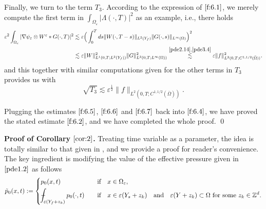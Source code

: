 \documentclass[13pt,CJK]{article}
\theoremstyle{plain}                       %
\theoremstyle{remark}
\numberwithin{equation}{section}
\def\Xint#1{\mathchoice
  {\XXint\displaystyle\textstyle{#1}}%
  {\XXint\textstyle\scriptstyle{#1}}%
  {\XXint\scriptstyle\scriptscriptstyle{#1}}%
  {\XXint\scriptscriptstyle\scriptscriptstyle{#1}}%
  \!\int}
\def\XXint#1#2#3{{\setbox0=\hbox{$#1{#2#3}{\int}$}
  \vcenter{\hbox{$#2#3$}}\kern-.5\wd0}}
\def\dashint{\Xint-}
\begin{document}
Finally, we turn to the term $T_3$.
According to the expression of $\eqref{f:6.1}$,
we merely compute the first term in
$\int_{\Omega_{\varepsilon}}|\Lambda(\cdot,T)|^2$ as an example, i.e.,
there holds
\begin{equation*}
\begin{aligned}
\varepsilon^2\int_{\Omega_{\varepsilon}}
|\nabla\psi_\varepsilon
\otimes W^\varepsilon\ast G(\cdot,T)|^2
&\lesssim \varepsilon
\Big(\int_{0}^{T}ds\|W(\cdot,T-s)\|_{L^2(Y_f)}
\|G(\cdot,s)\|_{L^\infty(\Omega)}\Big)^2\\
&\lesssim \varepsilon\|W\|_{L^1(0,T;L^2(Y_f))}^2\|G\|_{L^2(0,T;L^\infty(\Omega))}^2
\overset{\eqref{pde2.14},\eqref{pde3.4}}{\lesssim}\varepsilon \|f\|_{L^2(0,T;C^{1,1/2}(\bar\Omega))}^2.
\end{aligned}
\end{equation*}
and this together with similar computations given for the other terms in $T_3$ provides us with
\begin{equation}\label{f:6.7}
\sqrt{T_3} \lesssim \varepsilon^{\frac{1}{2}}\|f\|_{L^2(0,T;C^{1,1/2}(\bar\Omega))}.
\end{equation}

\medskip
Plugging the estimates $\eqref{f:6.5}$, $\eqref{f:6.6}$ and
$\eqref{f:6.7}$ back into $\eqref{f:6.4}$, we have proved the stated
estimate $\eqref{f:6.2}$, and we have completed the whole proof.
\qed



\medskip

\noindent
\textbf{Proof of Corollary $\ref{cor:2}$.}
Treating time variable as a parameter,
the idea is totally similar to that given in \cite[pp.22]{Shen20}, and
we provide a proof for reader's convenience. The key ingredient is modifying the value of the effective pressure given in $\eqref{pde1.2}$ as follows
\begin{equation*}
\tilde{p}_{0}(x,t):=
\left\{
\begin{aligned}
&p_{0}(x,t)&\quad&\text{if}\quad x\in\Omega_{\varepsilon},\\
&\dashint_{\varepsilon(Y_f+z_{k})}p_{0}(\cdot,t)&\quad&\text{if}
\quad x\in\varepsilon(Y_{s}+z_{k}) \quad\text{and}\quad
\varepsilon(Y+z_k)\subset\Omega \text{~for~some~}z_{k}\in \mathbb{Z}^d.
\end{aligned}\right.
\end{equation*}
\end{document}
